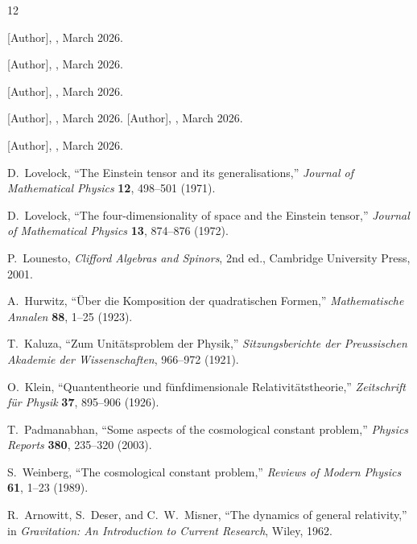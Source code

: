 \documentclass[12pt,a4paper]{article}
\begin{document}
\begin{thebibliography}{12}

 {[Author]}, , March 2026.

 {[Author]}, , March 2026.

 {[Author]}, , March 2026.

 {[Author]}, , March 2026.
 {[Author]}, , March 2026.

 {[Author]}, , March 2026.

 D.~Lovelock, ``The Einstein tensor and its generalisations,'' \textit{Journal of Mathematical Physics} \textbf{12}, 498--501 (1971).

 D.~Lovelock, ``The four-dimensionality of space and the Einstein tensor,'' \textit{Journal of Mathematical Physics} \textbf{13}, 874--876 (1972).

 P.~Lounesto, \textit{Clifford Algebras and Spinors}, 2nd ed., Cambridge University Press, 2001.

 A.~Hurwitz, ``\"Uber die Komposition der quadratischen Formen,'' \textit{Mathematische Annalen} \textbf{88}, 1--25 (1923).

 T.~Kaluza, ``Zum Unit\"atsproblem der Physik,'' \textit{Sitzungsberichte der Preussischen Akademie der Wissenschaften}, 966--972 (1921).

 O.~Klein, ``Quantentheorie und f\"unfdimensionale Relativit\"atstheorie,'' \textit{Zeitschrift f\"ur Physik} \textbf{37}, 895--906 (1926).

 T.~Padmanabhan, ``Some aspects of the cosmological constant problem,'' \textit{Physics Reports} \textbf{380}, 235--320 (2003).

 S.~Weinberg, ``The cosmological constant problem,'' \textit{Reviews of Modern Physics} \textbf{61}, 1--23 (1989).

 R.~Arnowitt, S.~Deser, and C.~W.~Misner, ``The dynamics of general relativity,'' in \textit{Gravitation: An Introduction to Current Research}, Wiley, 1962.

\end{thebibliography}
\end{document}
